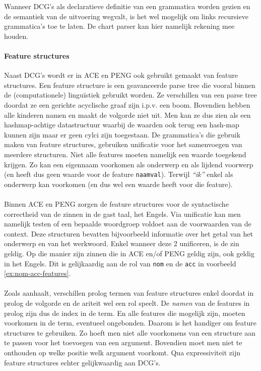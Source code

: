 \documentclass[]{article}
\theoremstyle{definition}
\newcommand{\example}[1]{\textit{``#1''}}
\begin{document}
Wanneer DCG's als declaratieve definitie van een grammatica worden gezien en de semantiek van de uitvoering wegvalt, is het wel mogelijk om links recursieve grammatica's toe te laten. De chart parser kan hier namelijk rekening mee houden.

\paragraph{Feature structures} Naast DCG's wordt er in ACE en PENG ook gebruikt gemaakt van feature structures\cite{Shieber2003}. Een feature structure is een geavanceerde parse tree die vooral binnen de (computationele) linguïstiek gebruikt worden. Ze verschillen van een parse tree doordat ze een gerichte acyclische graaf zijn i.p.v. een boom. Bovendien hebben alle kinderen namen en maakt de volgorde niet uit. Men kan ze dus zien als een hashmap-achtige datastructuur waarbij de waarden ook terug een hash-map kunnen zijn maar er geen cylci zijn toegestaan. De grammatica's die gebruik maken van feature structures, gebruiken unificatie voor het samenvoegen van meerdere structuren. Niet alle features moeten namelijk een waarde toegekend krijgen. Zo kan een eigennaam voorkomen als onderwerp en als lijdend voorwerp (en heeft dus geen waarde voor de feature \texttt{naamval}). Terwijl \example{ik} enkel als onderwerp kan voorkomen (en dus wel een waarde heeft voor die feature).

\paragraph{} Binnen ACE en PENG zorgen de feature structures voor de syntactische correctheid van de zinnen in de gast taal, het Engels. Via unificatie kan men namelijk testen of een bepaalde woordgroep voldoet aan de voorwaarden van de context. Deze structuren bevatten bijvoorbeeld informatie over het getal van het onderwerp en van het werkwoord. Enkel wanneer deze 2 unificeren, is de zin geldig. Op die manier zijn zinnen die in ACE en/of PENG geldig zijn, ook geldig in het Engels. Dit is gelijkaardig aan de rol van \texttt{nom} en de \texttt{acc} in voorbeeld \ref{ex:nom-acc-features}.

\paragraph{} Zoals \cite{Shieber2003} aanhaalt, verschillen prolog termen van feature structures enkel doordat in prolog de volgorde en de ariteit wel een rol speelt. De \textit{namen} van de features in prolog zijn dus de index in de term. En alle features die mogelijk zijn, moeten voorkomen in de term, eventueel ongebonden. Daarom is het handiger om feature structures te gebruiken. Zo hoeft men niet alle voorkomens van een structure aan te passen voor het toevoegen van een argument. Bovendien moet men niet te onthouden op welke positie welk argument voorkomt. Qua expressiviteit zijn feature structures echter gelijkwaardig aan DCG's.
\end{document}
